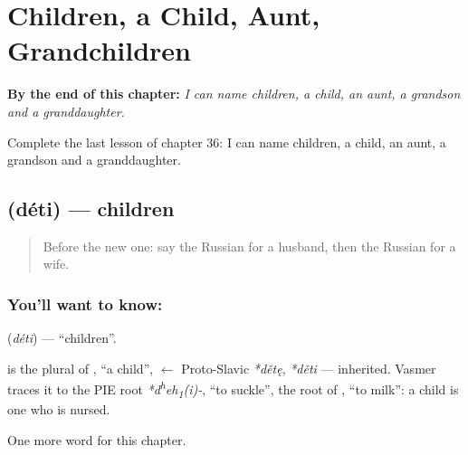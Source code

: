 
\chapter{Children, a Child, Aunt, Grandchildren}
\label{ch:ru-children-a-child-aunt-grandchildren}

\begin{chapteropening}
\textbf{By the end of this chapter:} \emph{I can name children, a child, an aunt, a grandson and a granddaughter.}

Complete the last lesson of chapter 36: I can name children, a child, an aunt, a grandson and a granddaughter.
\end{chapteropening}

\section[\texorpdfstring{\ru{дети} (déti)}{дети (déti)}]{ (déti) — children}

\label{lesson:RU-C36-children}



\begin{quote}
Before the new one: say the Russian for a husband, then the Russian for a wife.
\end{quote}

\subsection*{You'll want to know: }
\textbf{} (\emph{déti}) — \textquotedblleft{}children\textquotedblright{}.

\begin{cousinweb}
\textbf{} is the plural of \emph{}, \textquotedblleft{}a child\textquotedblright{}, $\leftarrow$ Proto-Slavic \emph{*dětę}, \emph{*děti} — inherited. Vasmer traces it to the PIE root \emph{*d\textsuperscript{h}eh\textsubscript{1}(i)-}, \textquotedblleft{}to suckle\textquotedblright{}, the root of \emph{}, \textquotedblleft{}to milk\textquotedblright{}: a child is one who is nursed.
\end{cousinweb}

\begin{grammarlens}[title={What you've built}]
One more word for this chapter.
\end{grammarlens}

